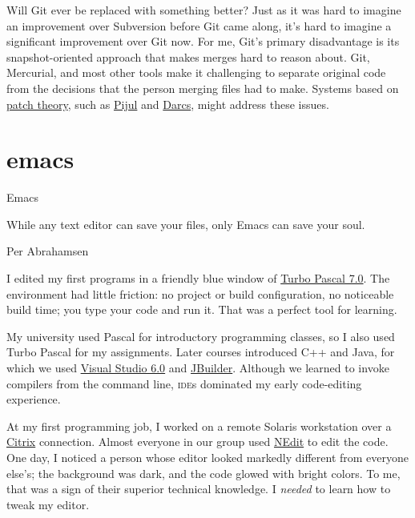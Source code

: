 \documentclass{article}
\begin{document}
Will Git ever be replaced with something better?
Just as it was hard to imagine an improvement over Subversion before Git came along, it's hard to imagine a significant improvement over Git now.
For me, Git's primary disadvantage is its snapshot-oriented approach that makes merges hard to reason about.
Git, Mercurial, and most other tools make it challenging to separate original code from the decisions that the person merging files had to make.
Systems based on \href{https://en.m.wikibooks.org/wiki/Understanding_Darcs/Patch_theory}{patch theory}, such as \href{https://pijul.org/}{Pijul} and \href{https://darcs.net/}{Darcs}, might address these issues.

\section{emacs}{Emacs}

\epigraph{
  While any text editor can save your files, only Emacs can save your soul.
}{Per Abrahamsen}

I edited my first programs in a friendly blue window of \href{https://en.wikipedia.org/wiki/Turbo_Pascal}{Turbo Pascal 7.0}.
The environment had little friction: no project or build configuration, no noticeable build time; you type your code and run it.
That was a perfect tool for learning.

My university used Pascal for introductory programming classes, so I also used Turbo Pascal for my assignments.
Later courses introduced C++ and Java, for which we used \href{https://en.wikipedia.org/wiki/Visual_Studio#6.0_(1998)}{Visual Studio 6.0} and \href{https://en.wikipedia.org/wiki/JBuilder}{JBuilder}.
Although we learned to invoke compilers from the command line, \textsc{ide}s dominated my early code-editing experience.

At my first programming job, I worked on a remote Solaris workstation over a \href{https://en.wikipedia.org/wiki/Citrix_Systems}{Citrix} connection.
Almost everyone in our group used \href{https://en.wikipedia.org/wiki/NEdit}{NEdit} to edit the code.
One day, I noticed a person whose editor looked markedly different from everyone else's; the background was dark, and the code glowed with bright colors.
To me, that was a sign of their superior technical knowledge.
I \emph{needed} to learn how to tweak my editor.
\end{document}
